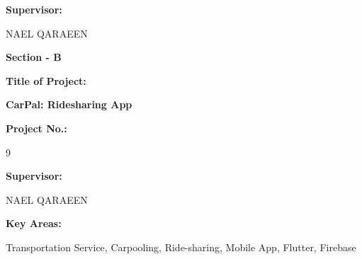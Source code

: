 \documentclass[a4paper, 12pt]{report} %
\begin{document}
\begin{titlepage}
            \vspace{0.8cm}

            \textbf{\large{Supervisor:}}
            \vspace{0.4cm}
            
            \hspace{\parindent} NAEL QARAEEN %
            \pagebreak

            \begin{center}
                \textbf{\large{Section - B}}
                \vspace{0.8cm}
                
                \textbf{\large{Title of Project:}}
                \vspace{0.4cm}
            
                \textbf{\Large{CarPal: Ridesharing App}}
                \vspace{0.8cm}

                \textbf{\large{Project No.:}}
                \vspace{0.4cm}
                
                9
                \vspace{0.8cm}

                \textbf{\large{Supervisor:}}
                \vspace{0.4cm}
            
                NAEL QARAEEN
                \vspace{0.8cm}


                \textbf{\large{Key Areas:}}
                \vspace{0.4cm}

                Transportation Service, Carpooling, Ride-sharing, Mobile App, Flutter, Firebase

            \end{center}
    \end{titlepage}
\end{document}
